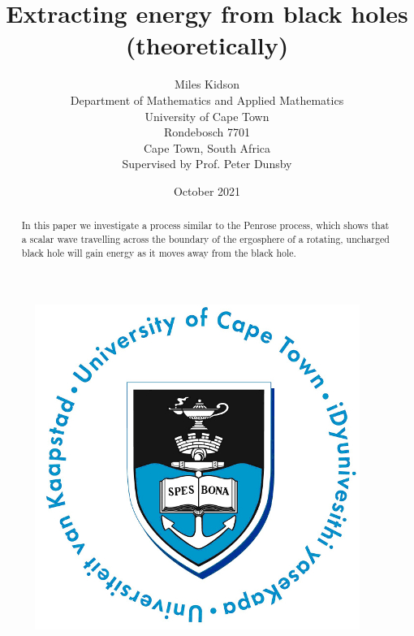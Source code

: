 \documentclass[11pt]{article}
\numberwithin{equation}{section}
\numberwithin{figure}{section}
\numberwithin{table}{section}
\begin{document}
\title{Extracting energy from black holes (theoretically)}
\author{Miles Kidson \\ Department of Mathematics and Applied Mathematics \\ University of Cape Town \\ Rondebosch 7701 \\ Cape Town, South Africa \\ Supervised by Prof. Peter Dunsby }
\date{October 2021}

\maketitle

\begin{figure}[h]
    \begin{center}
        \includegraphics{Plots/UCT.jpg}
    \end{center}
\end{figure}


\begin{center}
    \begin{abstract}
        In this paper we investigate a process similar to the Penrose process, which shows that a scalar wave travelling across the boundary of the ergosphere of a rotating, uncharged black hole will gain energy as it moves away from the black hole.
    \end{abstract}
\end{center}

\newpage
\end{document}
